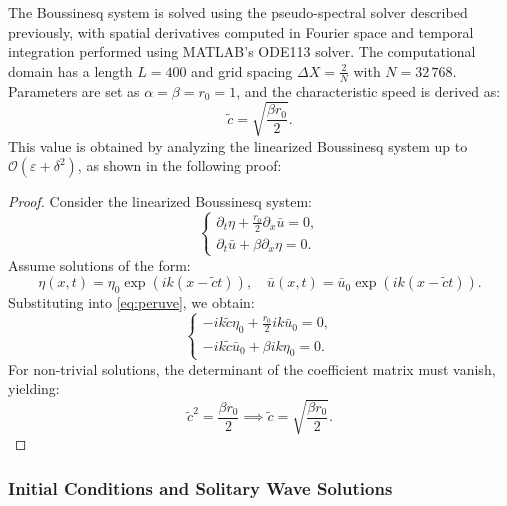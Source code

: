 \documentclass[alpha-refs, 12pt]{wiley-article}
\renewcommand{\O}{\mathcal{O}}
\newcommand{\eps}{\varepsilon}
\begin{document}
The Boussinesq system is solved using the pseudo-spectral solver described previously, with spatial derivatives computed in Fourier space and temporal integration performed using MATLAB's ODE113 solver. The computational domain has a length $L = 400$ and grid spacing $\Delta X = \frac{2}{N}$ with $N = 32\,768$. Parameters are set as $\alpha = \beta = r_0 = 1$, and the characteristic speed is derived as:
\[
  \tilde{c} = \sqrt{\dfrac{\beta r_0}{2}}.
\]
This value is obtained by analyzing the linearized Boussinesq system up to $\O(\eps + \delta^2)$, as shown in the following proof:
\begin{proof}
  Consider the linearized Boussinesq system:
  \begin{equation}\label{eq:peruve}
  \begin{cases}
  \partial_t \eta + \frac{r_0}{2} \partial_x \bar{u} = 0, \\
  \partial_t \bar{u} + \beta \partial_x \eta = 0.
  \end{cases}
  \end{equation}
  Assume solutions of the form:
  \[
  \eta(x,t) = \eta_0 \exp(i k (x - \tilde{c} t)), \quad \bar{u}(x,t) = \bar{u}_0 \exp(i k (x - \tilde{c} t)).
  \]
  Substituting into \eqref{eq:peruve}, we obtain:
  \[
  \begin{cases}
  -i k \tilde{c} \eta_0 + \frac{r_0}{2} i k \bar{u}_0 = 0, \\
  -i k \tilde{c} \bar{u}_0 + \beta i k \eta_0 = 0.
  \end{cases}
  \]
  For non-trivial solutions, the determinant of the coefficient matrix must vanish, yielding:
  \[
  \tilde{c}^2 = \frac{\beta r_0}{2} \implies \tilde{c} = \sqrt{\frac{\beta r_0}{2}}.
  \]
\end{proof}

\subsubsection{Initial Conditions and Solitary Wave Solutions}
\end{document}
